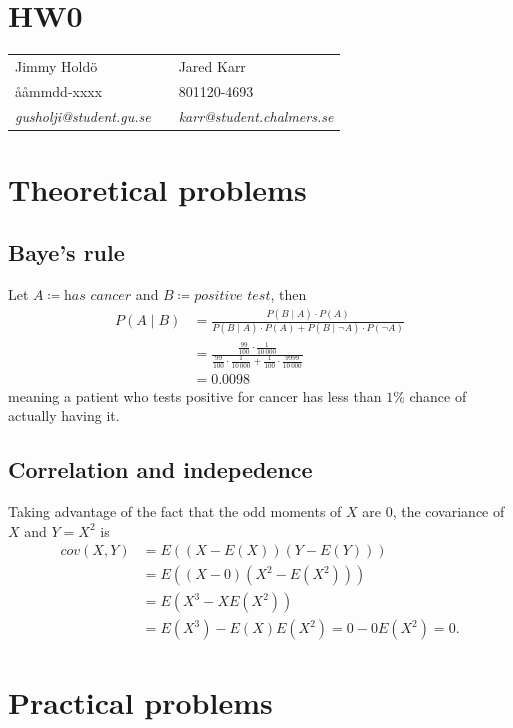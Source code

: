 \documentclass[a4paper,11pt]{article}
\DeclareMathOperator{\given}{\mid}
\begin{document}
\section*{HW0}

\begin{tabular*}{0.9\textwidth}{@{\extracolsep{\fill} } lll}
Jimmy Hold\"{o} & & Jared Karr\\
\aa\aa mmdd-xxxx & & 801120-4693\\
\it{gusholji@student.gu.se} & & \it{karr@student.chalmers.se}\\
\end{tabular*}

\section{Theoretical problems}
\subsection{Baye's rule}
Let $A\coloneqq\textit{has cancer}$ and $B\coloneqq\textit{positive test}$, then
\begin{align*}
P(A \given B) &= \frac{P(B \given A)\cdot P(A)}{P(B \given A)\cdot P(A)+P(B \given \neg A)\cdot P(\neg A)}  \\
              &= \frac{\frac{99}{100}\cdot\frac{1}{10\,000}}{\frac{99}{100}\cdot\frac{1}{10\,000}+\frac{1}{100}\cdot\frac{9999}{10\,000}} \\
              &= 0.0098
\end{align*}
meaning a patient who tests positive for cancer has less than $1\%$ chance of actually having it.

\subsection{Correlation and indepedence}
Taking advantage of the fact that the odd moments of $X$ are 0, the covariance of $X$ and $Y=X^2$ is
\begin{align*}
	cov(X, Y) &= E\left(\left(X-E(X)\right)\left(Y-E(Y)\right)\right) \\
	&=E\left(\left(X-0\right)\left(X^2-E(X^2)\right)\right) \\
	&=E\left(X^3-XE(X^2)\right) \\
	&=E(X^3)-E(X)E(X^2)=0 - 0E(X^2)=0.
\end{align*}
\clearpage
\section{Practical problems}
\end{document}
